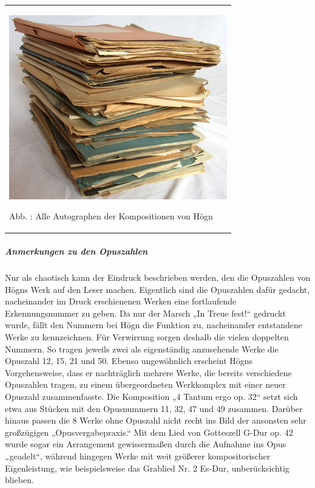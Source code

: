 \documentclass[a4paper]{article}
\newcounter{Abb}
\renewcommand\theAbb{\arabic{Abb}}
\begin{document}
\begin{center}
\tablefirsthead{}
\tablehead{}
\tabletail{}
\tablelasttail{}
\begin{supertabular}{m{9.701cm}}

\includegraphics[width=9.491cm,height=8.017cm]{pictures/zulassungsarbeit-img059.jpg}

Abb. \stepcounter{Abb}{\theAbb}: Alle Autographen der Kompositionen von
Högn\\
\end{supertabular}
\end{center}
\clearpage\subparagraph{Anmerkungen zu den Opuszahlen}
Nur als chaotisch kann der Eindruck beschrieben werden, den die
Opuszahlen von Högns Werk auf den Leser machen. Eigentlich sind die
Opuszahlen dafür gedacht, nacheinander im Druck erschienenen Werken
eine fortlaufende Erkennungsnummer zu geben. Da nur der Marsch „In
Treue fest!“ gedruckt wurde, fällt den Nummern bei Högn die Funktion
zu, nacheinander entstandene Werke zu kennzeichnen. Für Verwirrung
sorgen deshalb die vielen doppelten Nummern. So tragen jeweils zwei als
eigenständig anzusehende Werke die Opuszahl 12, 15, 21 und 50. Ebenso
ungewöhnlich erscheint Högns Vorgehensweise, dass er nachträglich
mehrere Werke, die bereits verschiedene Opuszahlen tragen, zu einem
übergeordneten Werkkomplex mit einer neuer Opuszahl zusammenfasste. Die
Komposition „4 Tantum ergo op. 32“ setzt sich etwa aus Stücken mit den
Opusnummern 11, 32, 47 und 49 zusammen. Darüber hinaus passen die 8
Werke ohne Opuszahl nicht recht ins Bild der ansonsten sehr großzügigen
„Opusvergabepraxis.“ Mit dem Lied von Gotteszell G-Dur op. 42 wurde
sogar ein Arrangement gewissermaßen durch die Aufnahme ins Opus
„geadelt“, während hingegen Werke mit weit größerer kompositorischer
Eigenleistung, wie beispielsweise das Grablied Nr. 2 Es-Dur,
unberücksichtig blieben.
\end{document}
